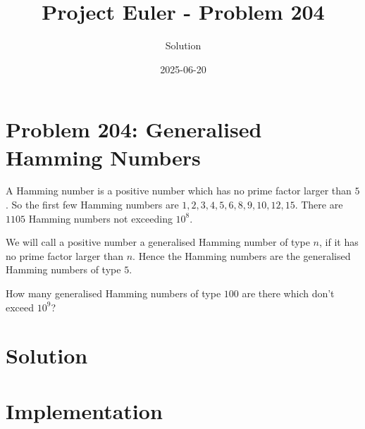 \documentclass{article}
\title{Project Euler - Problem 204}
\author{Solution}
\date{2025-06-20}
\begin{document}
\maketitle

\section*{Problem 204: Generalised Hamming Numbers}


A Hamming number is a positive number which has no prime factor larger than $5$.
So the first few Hamming numbers are $1, 2, 3, 4, 5, 6, 8, 9, 10, 12, 15$.
There are $1105$ Hamming numbers not exceeding $10^8$.

\par
We will call a positive number a generalised Hamming number of type $n$, if it has no prime factor larger than $n$.
Hence the Hamming numbers are the generalised Hamming numbers of type $5$.

\par
How many generalised Hamming numbers of type $100$ are there which don't exceed $10^9$?

\par


\section*{Solution}


\section*{Implementation}

\end{document}
